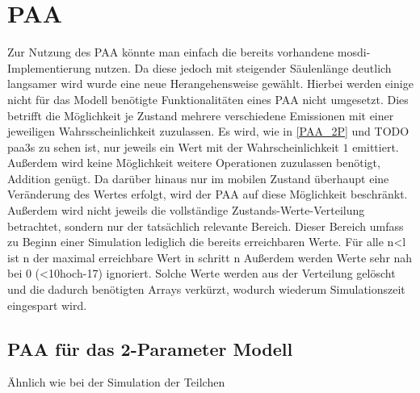 \section{PAA}

Zur Nutzung des PAA könnte man einfach die bereits vorhandene mosdi-Implementierung nutzen. Da diese jedoch mit steigender Säulenlänge deutlich langsamer wird  wurde eine neue Herangehensweise gewählt. Hierbei werden einige nicht für das Modell benötigte Funktionalitäten eines PAA nicht umgesetzt. 
Dies betrifft die Möglichkeit je Zustand mehrere verschiedene Emissionen mit einer jeweiligen Wahrsscheinlichkeit zuzulassen. Es wird, wie in \ref{PAA_2P} und TODO paa3s zu sehen ist, nur jeweils ein Wert mit der Wahrscheinlichkeit $1$ emittiert. Außerdem wird keine Möglichkeit weitere Operationen zuzulassen benötigt, Addition genügt. Da darüber hinaus nur im mobilen Zustand überhaupt eine Veränderung des Wertes erfolgt, wird der PAA auf diese Möglichkeit beschränkt.
Außerdem wird nicht jeweils die vollständige Zustands-Werte-Verteilung betrachtet, sondern nur der tatsächlich relevante Bereich. Dieser Bereich umfass zu Beginn einer Simulation lediglich die bereits erreichbaren Werte.
Für alle n<l ist n der maximal erreichbare Wert in schritt n
Außerdem werden Werte sehr nah bei 0 (<10hoch-17) ignoriert. Solche Werte werden aus der Verteilung gelöscht und die dadurch benötigten Arrays verkürzt, wodurch wiederum Simulationszeit eingespart wird.



\subsection{PAA für das 2-Parameter Modell}

Ähnlich wie bei der Simulation der Teilchen 

